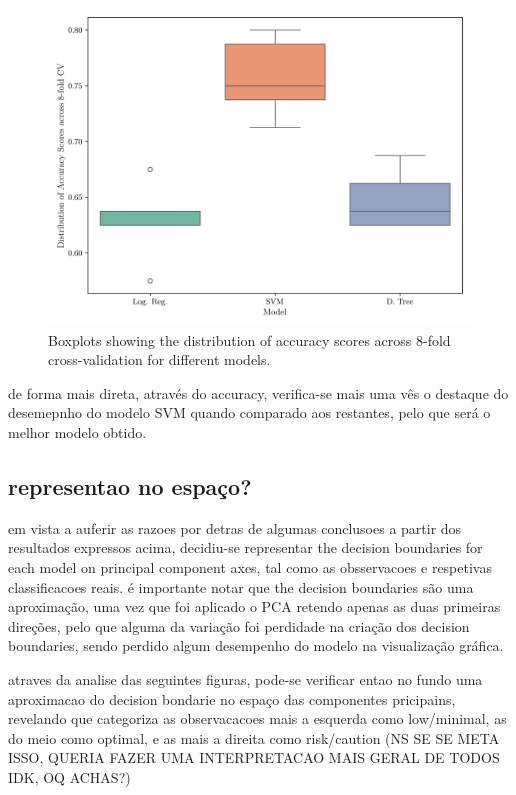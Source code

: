 \documentclass[conference]{IEEEtran}
\begin{document}
\begin{figure}[H]
    \centering
    \includegraphics[width=1\linewidth]{assets/box_accuracy.png}
    \caption{Boxplots showing the distribution of accuracy scores across 8-fold cross-validation for different models.}
    \label{box_accuracy}
\end{figure}

de forma mais direta, através do accuracy, verifica-se mais uma vês o destaque do desemepnho do modelo SVM quando comparado aos restantes, pelo que será o melhor modelo obtido.

\subsection{representao no espaço?}

em vista a auferir as razoes por detras de algumas conclusoes a partir dos resultados expressos acima, decidiu-se representar the decision boundaries for each model on principal component axes, tal como as obsservacoes e respetivas classificacoes reais. é importante notar que the decision boundaries são uma aproximação, uma vez que foi aplicado o PCA retendo apenas as duas primeiras direções, pelo que alguma da variação foi perdidade na criação dos decision boundaries, sendo perdido algum desempenho do modelo na visualização gráfica.

atraves da analise das seguintes figuras, pode-se verificar entao no fundo uma aproximacao do decision bondarie no espaço das componentes pricipains, revelando que categoriza as observacacoes mais a esquerda como low/minimal, as do meio como optimal, e as mais a direita como risk/caution (NS SE SE META ISSO, QUERIA FAZER UMA INTERPRETACAO MAIS GERAL DE TODOS IDK, OQ ACHAS?)
\end{document}
